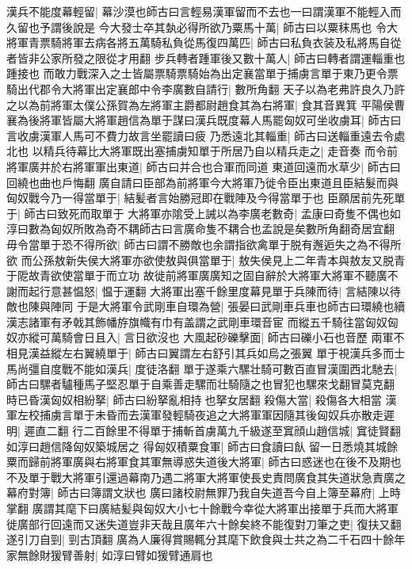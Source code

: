 漢兵不能度幕輕留|{
	幕沙漠也師古曰言輕易漢軍留而不去也一曰謂漢軍不能輕入而久留也予謂後說是}
今大發士卒其埶必得所欲乃粟馬十萬|{
	師古曰以粟秣馬也}
令大將軍青票騎將軍去病各將五萬騎私負從馬復四萬匹|{
	師古曰私負衣装及私將馬自從者皆非公家所發之限從才用翻}
步兵轉者踵軍後又數十萬人|{
	師古曰轉者謂運輜重也踵接也}
而敢力戰深入之士皆屬票騎票騎始為出定襄當單于捕虜言單于東乃更令票騎出代郡令大將軍出定襄郎中令李廣數自請行|{
	數所角翻}
天子以為老弗許良久乃許之以為前將軍太僕公孫賀為左將軍主爵都尉趙食其為右將軍|{
	食其音異箕}
平陽侯曹襄為後將軍皆屬大將軍趙信為單于謀曰漢兵既度幕人馬罷匈奴可坐收虜耳|{
	師古曰言收虜漢軍人馬可不費力故言坐罷讀曰疲}
乃悉遠北其輜重|{
	師古曰送輜重遠去令處北也}
以精兵待幕比大將軍既出塞捕虜知單于所居乃自以精兵走之|{
	走音奏}
而令前將軍廣并於右將軍軍出東道|{
	師古曰并合也合軍而同道}
東道回遠而水草少|{
	師古曰回繞也曲也戶悔翻}
廣自請曰臣部為前將軍今大將軍乃徙令臣出東道且臣結髮而與匈奴戰今乃一得當單于|{
	結髪者言始勝冠即在戰陣及今得當單于也}
臣願居前先死單于|{
	師古曰致死而取單于}
大將軍亦隂受上誡以為李廣老數奇|{
	孟康曰奇隻不偶也如淳曰數為匈奴所敗為奇不耦師古曰言廣命隻不耦合也孟說是矣數所角翻奇居宜翻}
毋令當單于恐不得所欲|{
	師古曰謂不勝敵也余謂指欲禽單于脱有邂逅失之為不得所欲}
而公孫敖新失侯大將軍亦欲使敖與俱當單于|{
	敖失侯見上二年青本與敖友又脱青于阸故青欲使當單于而立功}
故徙前將軍廣廣知之固自辭於大將軍大將軍不聽廣不謝而起行意甚愠怒|{
	愠于運翻}
大將軍出塞千餘里度幕見單于兵陳而待|{
	言結陳以待敵也陳與陣同}
于是大將軍令武剛車自環為營|{
	張晏曰武剛車兵車也師古曰環繞也續漢志諸軍有矛戟其飾幡斿旗幟有巾有盖謂之武剛車環音宦}
而縱五千騎往當匈奴匈奴亦縱可萬騎會日且入|{
	言日欲沒也}
大風起砂礫擊面|{
	師古曰礫小石也音歷}
兩軍不相見漢益縱左右翼繞單于|{
	師古曰翼謂左右舒引其兵如烏之張翼}
單于視漢兵多而士馬尚彊自度戰不能如漢兵|{
	度徒洛翻}
單于遂乘六騾壮騎可數百直冒漢圍西北馳去|{
	師古曰騾者驢種馬子堅忍單于自乘善走騾而壮騎隨之也冒犯也騾來戈翻冒莫克翻}
時已昏漢匈奴相紛拏|{
	師古曰紛拏亂相持也拏女居翻}
殺傷大當|{
	殺傷各大相當}
漢軍左校捕虜言單于未昏而去漢軍發輕騎夜追之大將軍軍因隨其後匈奴兵亦散走遲明|{
	遲直二翻}
行二百餘里不得單于捕斬首虜萬九千級遂至窴顔山趙信城|{
	窴徒賢翻如淳曰趙信降匈奴築城居之}
得匈奴積粟食軍|{
	師古曰食讀曰飤}
留一日悉燒其城餘粟而歸前將軍廣與右將軍食其軍無導惑失道後大將軍|{
	師古曰惑迷也在後不及期也}
不及單于戰大將軍引還過幕南乃遇二將軍大將軍使長史責問廣食其失道狀急責廣之幕府對簿|{
	師古曰簿謂文狀也}
廣曰諸校尉無罪乃我自失道吾今自上簿至幕府|{
	上時掌翻}
廣謂其麾下曰廣結髪與匈奴大小七十餘戰今幸從大將軍出接單于兵而大將軍徙廣部行回遠而又迷失道豈非天哉且廣年六十餘矣終不能復對刀筆之吏|{
	復扶又翻}
遂引刀自剄|{
	剄古頂翻}
廣為人廉得賞賜輒分其麾下飲食與士共之為二千石四十餘年家無餘財猨臂善射|{
	如淳曰臂如猨臂通肩也}
